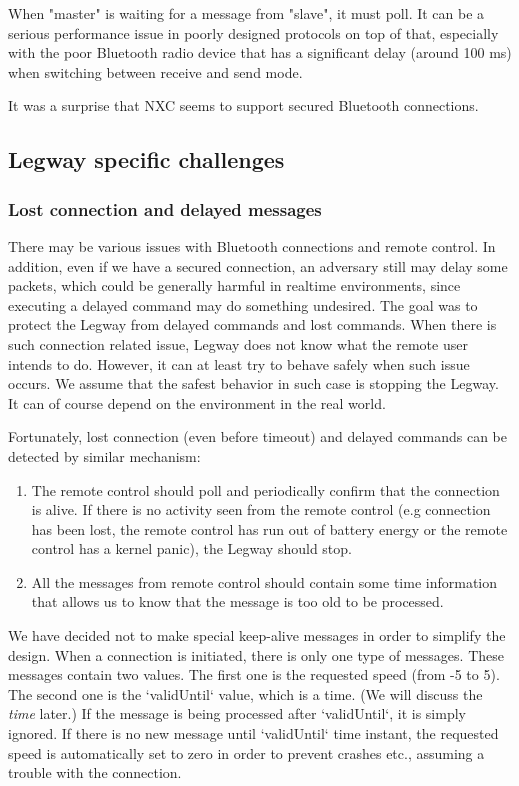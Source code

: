 \documentclass{article}
\begin{document}
When "master" is waiting for a message from "slave", it must poll. It can be a serious performance issue in poorly designed protocols on top of that, especially with the poor Bluetooth radio device that has a significant delay (around 100 ms) when switching between receive and send mode.

It was a surprise that NXC seems to support secured Bluetooth connections.


\subsection{Legway specific challenges}

\subsubsection{Lost connection and delayed messages}

There may be various issues with Bluetooth connections and remote control. In addition, even if we have a secured connection, an adversary still may delay some packets, which could be generally harmful in realtime environments, since executing a delayed command may do something undesired. The goal was to protect the Legway from delayed commands and lost commands. When there is such connection related issue, Legway does not know what the remote user intends to do. However, it can at least try to behave safely when such issue occurs. We assume that the safest behavior in such case is stopping the Legway. It can of course depend on the environment in the real world.

Fortunately, lost connection (even before timeout) and delayed commands can be detected by similar mechanism:

\begin{enumerate}
\item The remote control should poll and periodically confirm that the connection is alive. If there is no activity seen from the remote control (e.g connection has been lost, the remote control has run out of battery energy or the remote control has a kernel panic), the Legway should stop.
\item All the messages from remote control should contain some time information that allows us to know that the message is too old to be processed.
\end{enumerate}

We have decided not to make special keep-alive messages in order to simplify the design. When a connection is initiated, there is only one type of messages. These messages contain two values. The first one is the requested speed (from -5 to 5). The second one is the `validUntil` value, which is a time. (We will discuss the \textit{time} later.) If the message is being processed after `validUntil`, it is simply ignored. If there is no new message until `validUntil` time instant, the requested speed is automatically set to zero in order to prevent crashes etc., assuming a trouble with the connection.
\end{document}

